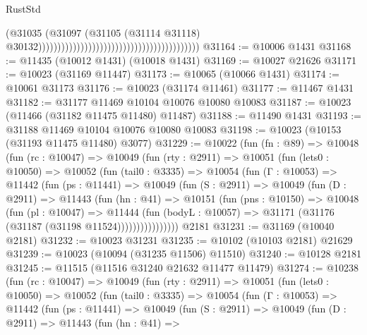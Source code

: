 \begin{lexlean}{RustStd}
\begin{coremodule}
                                                                                  (@31035
                                                                                    (@31097
                                                                                      (@31105
                                                                                        (@31114
                                                                                          @31118)
                                                                                        @30132))))))))))))))))))))))))))))))))))))))))))
@31164 := @10006 @1431
@31168 := @11435 (@10012 @1431) (@10018 @1431)
@31169 := @10027 @21626
@31171 := @10023 (@31169 @11447)
@31173 := @10065 (@10066 @1431)
@31174 := @10061 @31173
@31176 := @10023 (@31174 @11461)
@31177 := @11467 @1431
@31182 := @31177 @11469 @10104 @10076 @10080 @10083
@31187 := @10023 (@11466 (@31182 @11475 @11480) @11487)
@31188 := @11490 @1431
@31193 := @31188 @11469 @10104 @10076 @10080 @10083
@31198 := @10023 (@10153 (@31193 @11475 @11480) @3077)
@31229 := @10022
    (fun (fn : @89) =>
    @10048
      (fun (rc : @10047) =>
      @10049
        (fun (rty : @2911) =>
        @10051
          (fun (lets0 : @10050) =>
          @10052
            (fun (tail0 : @3335) =>
            @10054
              (fun (Γ : @10053) =>
              @11442
                (fun (ps : @11441) =>
                @10049
                  (fun (S : @2911) =>
                  @10049
                    (fun (D : @2911) =>
                    @11443
                      (fun (hn : @41) =>
                      @10151
                        (fun (pns : @10150) =>
                        @10048
                          (fun (pl : @10047) =>
                          @11444
                            (fun (bodyL : @10057) =>
                            @31171 (@31176 (@31187 (@31198 @11524))))))))))))))))
    @2181
@31231 := @31169 (@10040 @2181)
@31232 := @10023 @31231
@31235 := @10102 (@10103 @2181) @21629
@31239 := @10023 (@10094 (@31235 @11506) @11510)
@31240 := @10128 @2181
@31245 := @11515 (@11516 @31240 @21632 @11477 @11479)
@31274 := @10238
    (fun (rc : @10047) =>
    @10049
      (fun (rty : @2911) =>
      @10051
        (fun (lets0 : @10050) =>
        @10052
          (fun (tail0 : @3335) =>
          @10054
            (fun (Γ : @10053) =>
            @11442
              (fun (ps : @11441) =>
              @10049
                (fun (S : @2911) =>
                @10049
                  (fun (D : @2911) =>
                  @11443
                    (fun (hn : @41) =>

\end{coremodule}
\end{lexlean}
